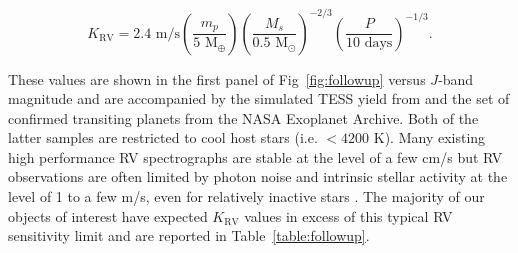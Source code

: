 \begin{equation}
  K_{\text{RV}} = 2.4 \text{ m/s} \left( \frac{m_p}{5 \text{ M}_{\oplus}} \right)
  \left( \frac{M_s}{0.5 \text{ M}_{\odot}} \right)^{-2/3} 
  \left( \frac{P}{10\text{ days}} \right)^{-1/3}.
\end{equation}

\noindent These values are shown in the first panel of Fig~\ref{fig:followup} versus $J$-band magnitude
and are accompanied by the simulated TESS yield from \cite{barclay18} and the set of
confirmed transiting planets from the NASA Exoplanet Archive.
Both of the latter samples are restricted to cool host stars (i.e. \teff{}
$<4200$ K). Many existing high performance RV spectrographs are stable at the level of a few cm/s but
RV observations are often limited by photon noise and intrinsic stellar activity at the level of 1 to a few
m/s, even for relatively inactive stars \citep{fischer16}. 
The majority of our objects of interest have expected $K_{\text{RV}}$ values in excess of this typical RV
sensitivity limit and are reported in Table~\ref{table:followup}. 

